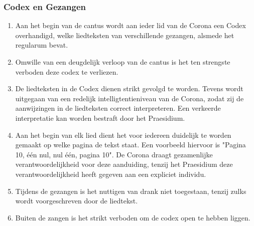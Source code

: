 \subsubsection*{Codex en Gezangen}
\begin{enumerate}
    \item Aan het begin van de cantus wordt aan ieder lid van de Corona een Codex overhandigd, welke liedteksten van verschillende gezangen, alsmede het regularum bevat.
    \item Omwille van een deugdelijk verloop van de cantus is het ten strengste verboden deze codex te verliezen.
    \item De liedteksten in de Codex dienen strikt gevolgd te worden. Tevens wordt uitgegaan van een redelijk intelligtentieniveau van de Corona, zodat zij de aanwijzingen in de liedteksten correct interpreteren. Een verkeerde interpretatie kan worden bestraft door het Praesidium.
    \item Aan het begin van elk lied dient het voor iedereen duidelijk te worden gemaakt op welke pagina de tekst staat. Een voorbeeld hiervoor is "Pagina 10, één nul, nul één, pagina 10". De Corona draagt gezamenlijke verantwoordelijkheid voor deze aanduiding, tenzij het Praesidium deze verantwoordelijkheid heeft gegeven aan een expliciet individu. 
    \item Tijdens de gezangen is het nuttigen van drank niet toegestaan, tenzij zulks wordt voorgeschreven door de liedtekst.
    \item Buiten de zangen is het strikt verboden om de codex open te hebben liggen. 
\end{enumerate}

